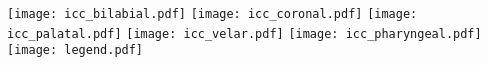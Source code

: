 \documentclass[varwidth=7in]{standalone}
\begin{document}
\raggedright

\texttt{[image: icc\_bilabial.pdf]}%
\texttt{[image: icc\_coronal.pdf]}%
\texttt{[image: icc\_palatal.pdf]}%
\texttt{[image: icc\_velar.pdf]}%
\texttt{[image: icc\_pharyngeal.pdf]}%
\texttt{[image: legend.pdf]}
\end{document}
